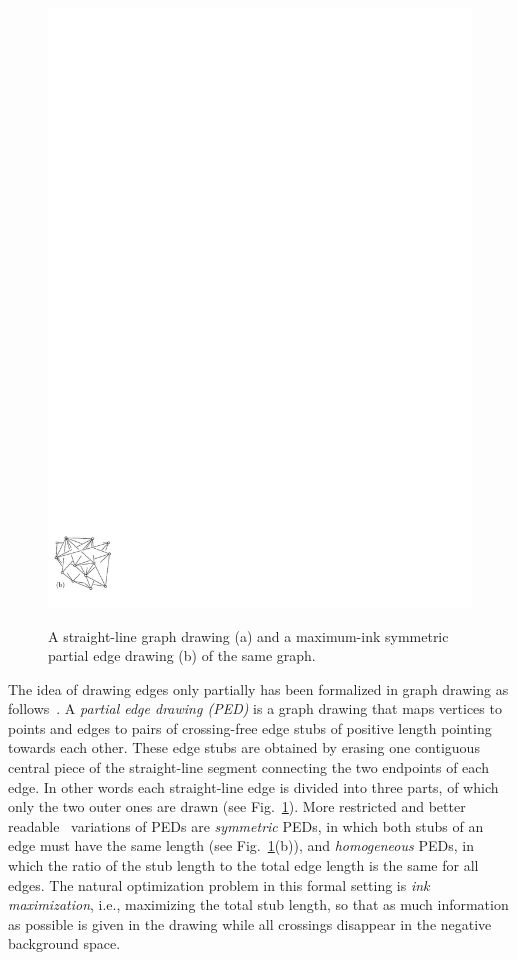 \documentclass[a4paper, USenglish]{llncs}
\begin{document}
\begin{figure}
{			\includegraphics{figures/export_alpha_nontouching}
		}	
		\caption{A straight-line graph drawing (a) and a maximum-ink symmetric partial edge drawing (b) of the same graph.}
		\label{fig:examples}
	\end{figure}
	
	
	The idea of drawing edges only partially has been formalized in graph drawing as follows~\cite{bk-ecbe-12}. 
	A \emph{partial edge drawing (PED)} is a graph drawing that maps vertices to points and edges to pairs of crossing-free edge stubs of positive length pointing towards each other.
	These edge stubs are obtained by erasing one contiguous central piece of the straight-line segment connecting the two endpoints of each edge.
	In other words each straight-line edge is divided into three parts, of which only the two outer ones are drawn (see Fig.~\ref{fig:examples}).
	More restricted and better readable~\cite{blmt-pedhmitc-16} variations of PEDs are \emph{symmetric} PEDs, in which both stubs of an edge must have the same length (see Fig.~\ref{fig:examples}(b)), and \emph{homogeneous} PEDs, in which the ratio of the stub length to the total edge length is the same for all edges.
	The natural optimization problem in this formal setting is \emph{ink maximization}, i.e., maximizing the total stub length, so that as much information as possible is given in the drawing while all crossings disappear in the negative background space. 	
	
\end{document}

